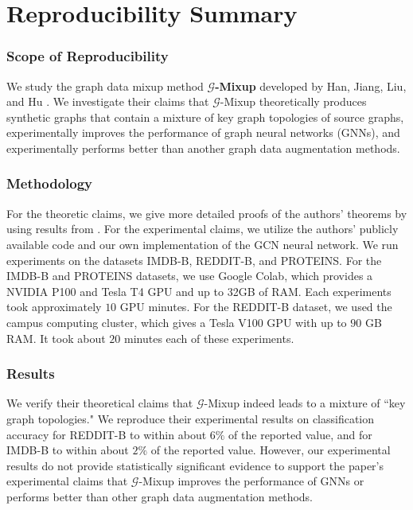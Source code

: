 \section*{\centering Reproducibility Summary}


\subsubsection*{Scope of Reproducibility}
We study the graph data mixup method \textbf{$\mathcal{G}$-Mixup} developed by Han, Jiang, Liu, and Hu \cite{Han:2022}. We investigate their claims that $\mathcal{G}$-Mixup theoretically produces synthetic graphs that contain a mixture of key graph topologies of source graphs, experimentally improves the performance of graph neural networks (GNNs), and experimentally performs better than another graph data augmentation methods.

\subsubsection*{Methodology}
For the theoretic claims, we give more detailed proofs of the authors' theorems by using results from \cite{Lovasz:2006}. For the experimental claims, we utilize the authors' publicly available code and our own implementation of the GCN neural network. We run experiments on the datasets IMDB-B, REDDIT-B, and PROTEINS. For the IMDB-B and PROTEINS datasets, we use Google Colab, which provides a NVIDIA P100 and Tesla T4 GPU and up to 32GB of RAM. Each experiments took approximately $10$ GPU minutes. For the REDDIT-B dataset, we used the campus computing cluster, which gives a Tesla V100 GPU with up to $90$ GB RAM. It took about $20$ minutes each of these experiments.

\subsubsection*{Results}
We verify their theoretical claims that $\mathcal{G}$-Mixup indeed leads to a mixture of ``key graph topologies." We reproduce their experimental results on classification accuracy for REDDIT-B to within about $6\%$ of the reported value, and for IMDB-B to within about $2\%$ of the reported value. However, our experimental results do not provide statistically significant evidence to support the paper's experimental claims that $\mathcal{G}$-Mixup improves the performance of GNNs or performs better than other graph data augmentation methods.

